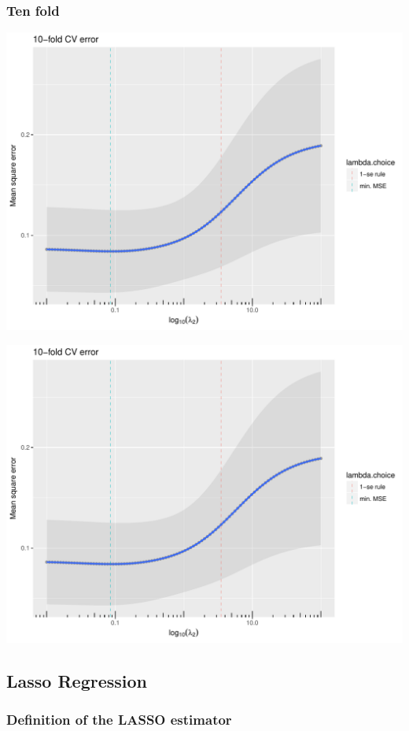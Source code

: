 \documentclass[10pt, c, xcolor=x11names]{beamer}\usepackage[]{graphicx}\usepackage[]{color}
\newenvironment{knitrout}{}{} %
\begin{document}
\begin{frame}[containsverbatim]
  \frametitle{Ten fold}
\begin{knitrout}\scriptsize
{}\color{fgcolor}
\includegraphics[width=.8\textwidth]{figures/ridgeplot_cv10_ridge-1} 

\includegraphics[width=.8\textwidth]{figures/ridgeplot_cv10_ridge-2} 

\end{knitrout}
\end{frame}





\subsection{Lasso Regression}

\subsubsection{Definition of the LASSO estimator}
\end{document}
